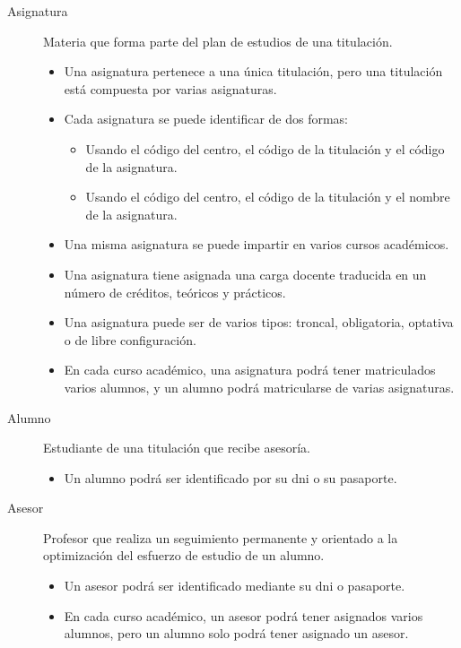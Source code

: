 \begin{description}
      \item[Asignatura] Materia que forma parte del plan de estudios de una
      titulación.
      \begin{itemize}
         \item Una asignatura pertenece a una única titulación, pero una
         titulación está compuesta por varias asignaturas.
         \item Cada asignatura se puede identificar de dos formas:
         \begin{itemize}
            \item Usando el código del centro, el código de la titulación y el
            código de la asignatura.
            \item Usando el código del centro, el código de la titulación y el
            nombre de la asignatura.
         \end{itemize}
         \item Una misma asignatura se puede impartir en varios cursos
         académicos.
         \item Una asignatura tiene asignada una carga docente traducida en un
         número de créditos, teóricos y prácticos.
         \item Una asignatura puede ser de varios tipos: troncal, obligatoria,
         optativa o de libre configuración.
         \item En cada curso académico, una asignatura podrá tener matriculados
         varios alumnos, y un alumno podrá matricularse de varias asignaturas.
      \end{itemize}

      \item[Alumno] Estudiante de una titulación que recibe asesoría.
      \begin{itemize}
         \item Un alumno podrá ser identificado por su dni o su pasaporte.
      \end{itemize}

      \item[Asesor] Profesor que realiza un seguimiento permanente y orientado a
      la optimización del esfuerzo de estudio de un alumno.
      \begin{itemize}
         \item Un asesor podrá ser identificado mediante su dni o pasaporte.
         \item En cada curso académico, un asesor podrá tener asignados varios
         alumnos, pero un alumno solo podrá tener asignado un asesor.
      \end{itemize}


\end{description}
